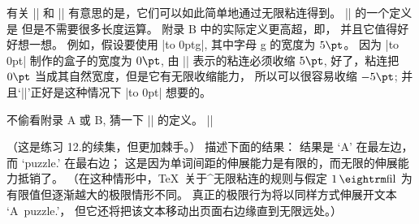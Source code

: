 \danger 有关 |\rlap| 和 |\llap| 有意思的是，它们可以如此简单地通过无限粘连得到。%
|\rlap| 的一个定义是
\begintt
\def\rlap#1{{\setbox0=\hbox{#1}\copy0\kern-\wd0}}
\endtt
但是不需要很多长度运算。%
附录 B 中的实际定义更高超，即，
\begintt
\def\rlap#1{\hbox to 0pt{#1\hss}}
\endtt
并且它值得好好想一想。%
\1例如，假设要使用 |\rlap{g}|, 其中字母 g 的宽度为 $5\pt$。%
因为 |\rlap| 制作的盒子的宽度为 $0\pt$,
由 |\hss| 表示的粘连必须收缩 $5\pt$,
好了，粘连把 $0\pt$ 当成其自然宽度，但是它有无限收缩能力，
所以可以很容易收缩 $-5\pt$;
并且`|\hskip-5pt|'正好是这种情况下 |\rlap| 想要的。

\dangerexercise 不偷看附录 A 或 B, 猜一下 |\llap| 的定义。
\answer \1|\def\llap#1{\hbox to 0pt{\hss#1}}|

\dangerexercise （这是练习 12.\linexno 的续集，但更加棘手。）
描述下面的结果：
\begintt
{}
\endtt
\answer 结果是 `A' 在最左边，而 `puzzle.\null' 在最右边；
这是因为单词间距的伸展能力是有限的，而无限的伸展能力抵销了。%
（在这种情形中，\TeX\ 关于^{无限粘连}的规则与假定 $1\,{\rm fil}$
为有限值但逐渐越大的极限情形不同。
真正的极限行为将以同样方式伸展开文本 `A~puzzle.\null'，
但它还将把该文本移动出页面右边缘直到无限远处。）

